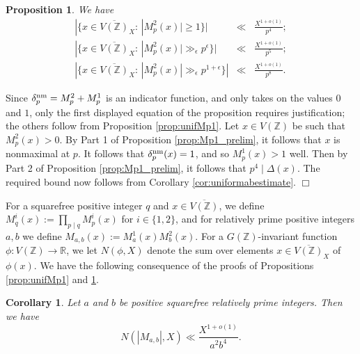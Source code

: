 \documentclass{article}
\def\Z{{\mathbb Z}}
\def\nm{{\rm nm}}
\def\R{{\mathbb R}}
\def\Z{{\mathbb Z}}
\def\ol{\overline}
\newtheorem{corollary}[theorem]{Corollary}
\newtheorem{proposition}[theorem]{Proposition}
\newenvironment{proof}{\noindent {\bf Proof:}}{$\Box$ \vspace{2 ex}}
\begin{document}
\begin{proposition}\label{prop:unifMp2}
We have
\begin{equation*}
\begin{array}{rcl}
|\{x\in \ol{V(\Z)}_X:\,|M_p^2(x)|\geq 1 \}|
&\ll& \displaystyle\frac{X^{1+o(1)}}{p^4}; \\[.15in]
|\{x\in \ol{V(\Z)}_X:\,|M_p^2(x)|\gg_\epsilon p^\epsilon\}|
&\ll& \displaystyle\frac{X^{1+o(1)}}{p^5}; \\[.15in]
|\{x\in \ol{V(\Z)}_X:\,|M_p^2(x)|\gg_\epsilon p^{1+\epsilon}\}|
&\ll& \displaystyle\frac{X^{1+o(1)}}{p^8}.
\end{array}
\end{equation*}    
\end{proposition}
\begin{proof}
Since $\delta_p^{\nm}=M_p^2+M_p^1$ is an indicator function, and only takes on the values $0$ and $1$, only the first displayed equation of the proposition requires justification; the others follow from Proposition \ref{prop:unifMp1}. Let $x\in V(\Z)$ be such that $M_p^2(x)>0$. By Part 1 of Proposition \ref{prop:Mp1_prelim}, it follows that $x$ is nonmaximal at $p$. It follows that $\delta_p^\nm(x)=1$, and so $M_p^1(x)>1$ well. Then by Part 2 of Proposition \ref{prop:Mp1_prelim}, it follows that $p^4\mid\Delta(x)$.
The required bound now follows from Corollary \ref{cor:uniformabestimate}.
\end{proof}

For a squarefree positive integer $q$ and $x\in\ol{V(\Z)}$, we define $M^i_q(x):=\prod_{p\mid q}M^i_p(x)$ for $i\in\{1,2\}$, and for relatively prime positive integers $a,b$ we define $M_{a,b}(x):=M^1_a(x)M^2_b(x)$. For a $G(\Z)$-invariant function $\phi:V(\Z)\to\R$, we let $N(\phi,X)$ denote the sum over elements $x\in\overline{V(\Z)}_X$ of $\phi(x)$. We have the following consequence of the proofs of Propositions \ref{prop:unifMp1} and \ref{prop:unifMp2}.
\begin{corollary}\label{cor:weighted_unif}
Let $a$ and $b$ be positive squarefree relatively prime integers. Then we have
\begin{equation*}
N(|M_{a,b}|,X)\ll \frac{X^{1+o(1)}}{a^2b^4}.
\end{equation*}
\end{corollary}

\medskip
\end{document}
